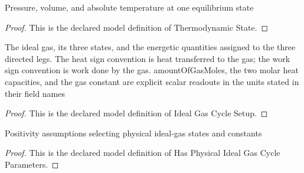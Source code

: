 \begin{definition}
  \label{def:physics:phyx-mini-0342:phyxminiproblems-problemphyxmini0342-thermodynamicstate}
  Pressure, volume, and absolute temperature at one equilibrium state
\end{definition}
\begin{proof}
  This is the declared model definition of Thermodynamic State.
\end{proof}
\begin{definition}
  \label{def:physics:phyx-mini-0342:phyxminiproblems-problemphyxmini0342-idealgascyclesetup}
  The ideal gas, its three states, and the energetic quantities assigned to the three directed legs. The heat sign convention is heat transferred to the gas; the work sign convention is work done by the gas. amountOfGasMoles, the two molar heat capacities, and the gas constant are explicit scalar readouts in the units stated in their field names
\end{definition}
\begin{proof}
  This is the declared model definition of Ideal Gas Cycle Setup.
\end{proof}
\begin{definition}
  \label{def:physics:phyx-mini-0342:phyxminiproblems-problemphyxmini0342-hasphysicalidealgascycleparameters}
  Positivity assumptions selecting physical ideal-gas states and constants
\end{definition}
\begin{proof}
  This is the declared model definition of Has Physical Ideal Gas Cycle Parameters.
\end{proof}
